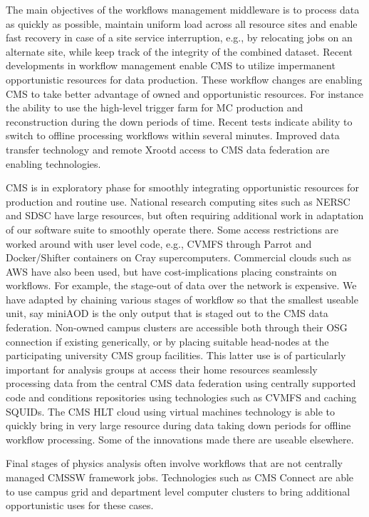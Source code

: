 \documentclass[11pt,a4paper]{article}
\begin{document}

The main objectives of the workflows management middleware is to
process data as quickly as possible, maintain uniform load across all
resource sites and enable fast recovery in case of a site service
interruption, e.g., by relocating jobs on an alternate site, while
keep track of the integrity of the combined dataset.  Recent
developments in workflow management enable CMS to utilize impermanent
opportunistic resources for data production. These workflow changes
are enabling CMS to take better advantage of owned and opportunistic
resources.  For instance the ability to use the high-level trigger
farm for MC production and reconstruction during the down periods of
time. Recent tests indicate ability to switch to offline processing
workflows within several minutes. Improved data transfer technology
and remote Xrootd access to CMS data federation are enabling
technologies.


CMS is in exploratory phase for smoothly integrating opportunistic
resources for production and routine use. National research computing
sites such as NERSC and SDSC have large resources, but often requiring
additional work in adaptation of our software suite to smoothly
operate there. Some access restrictions are worked around with user
level code, e.g., CVMFS through Parrot and Docker/Shifter containers
on Cray supercomputers. Commercial clouds such as AWS have also been
used, but have cost-implications placing constraints on workflows. For
example, the stage-out of data over the network is expensive. We have
adapted by chaining various stages of workflow so that the smallest
useable unit, say miniAOD is the only output that is staged out to the
CMS data federation. Non-owned campus clusters are accessible both
through their OSG connection if existing generically, or by placing
suitable head-nodes at the participating university CMS group
facilities. This latter use is of particularly important for analysis
groups at access their home resources seamlessly processing data from
the central CMS data federation using centrally supported code and
conditions repositories using technologies such as CVMFS and caching
SQUIDs. The CMS HLT cloud using virtual machines technology is able to
quickly bring in very large resource during data taking down periods
for offline workflow processing. Some of the innovations made there
are useable elsewhere.

Final stages of physics analysis often involve workflows that are not
centrally managed CMSSW framework jobs. Technologies such as CMS
Connect are able to use campus grid and department level computer
clusters to bring additional opportunistic uses for these cases.
\end{document}
